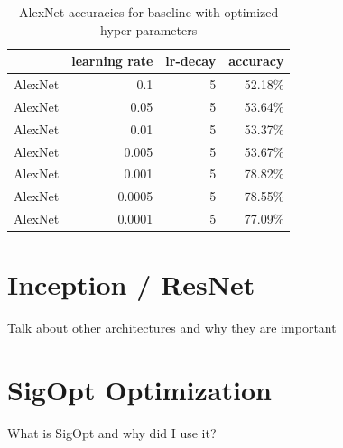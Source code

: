 \begin{table}[t] \centering
{}
\caption{AlexNet accuracies for baseline with optimized hyper-parameters}
\begin{tabular}{@{}rrrr@{}}
\toprule & learning rate & lr-decay & accuracy \\
\midrule
AlexNet		& 0.1 		& 5		& 52.18\%  \\
AlexNet		& 0.05 		& 5		& 53.64\%  \\
AlexNet		& 0.01 		& 5		& 53.37\%  \\
AlexNet		& 0.005 		& 5		& 53.67\%  \\
AlexNet		& 0.001 		& 5		& 78.82\%  \\
AlexNet		& 0.0005 		& 5		& 78.55\%  \\
AlexNet		& 0.0001 		& 5		& 77.09\%  \\
\bottomrule
\end{tabular}
\label{tbl:AlexNetBaseline}
\end{table}


\section{Inception / ResNet}

Talk about other architectures and why they are important

\section{SigOpt Optimization}

What is SigOpt and why did I use it?
